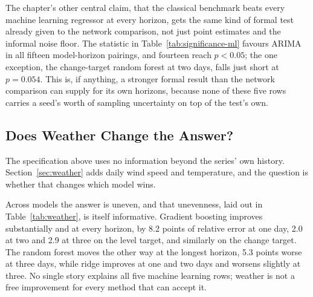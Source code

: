 \documentclass[12pt,a4paper]{report}
\begin{document}
\begin{table}[htbp]
\centering
\caption{Diebold-Mariano test of ARIMA against each point-forecast machine
learning regressor (Section~\ref{sec:dmtest}). A negative statistic favours
the machine learning model; a positive one favours ARIMA. An asterisk marks
$p<0.05$, two-sided.}
\label{tab:significance-ml}
\footnotesize

\end{table}

The chapter's other central claim, that the classical benchmark beats every machine learning regressor at every horizon, gets the same kind of formal test already given to the network comparison, not just point estimates and the informal noise floor. The statistic in Table~\ref{tab:significance-ml} favours ARIMA in all fifteen model-horizon pairings, and fourteen reach $p<0.05$; the one exception, the change-target random forest at two days, falls just short at $p=0.054$. This is, if anything, a stronger formal result than the network comparison can supply for its own horizons, because none of these five rows carries a seed's worth of sampling uncertainty on top of the test's own.

\subsection{Does Weather Change the Answer?}
\label{sec:results-weather}

The specification above uses no information beyond the series' own history.
Section~\ref{sec:weather} adds daily wind speed and temperature, and the
question is whether that changes which model wins.

\begin{table}[htbp]
\centering
\caption{Change in rMAE from adding weather covariates, same rolling-origin
protocol and same reference as Table~\ref{tab:accuracy}. Negative is an
improvement. The network's weather row is given as its own absolute range
over ten seeds, to be read against its row in Table~\ref{tab:accuracy}.}
\label{tab:weather}
\footnotesize
\resizebox{\textwidth}{!}{}
\end{table}

Across models the answer is uneven, and that unevenness, laid out in Table~\ref{tab:weather}, is itself informative. Gradient boosting improves substantially and at every horizon, by 8.2 points of relative error at one day, 2.0 at two and 2.9 at three on the level target, and similarly on the change target. The random forest moves the other way at the longest horizon, 5.3 points worse at three days, while ridge improves at one and two days and worsens slightly at three. No single story explains all five machine learning rows; weather is not a free improvement for every method that can accept it.
\end{document}
